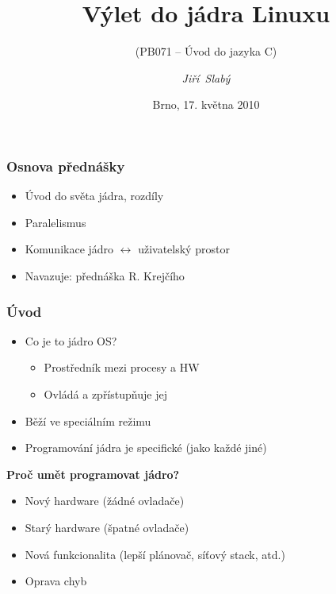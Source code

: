 \documentclass[xcolor=dvipsnames]{beamer}
\title[Linux Kernel] %
{Výlet do jádra Linuxu}
\subtitle{(PB071 -- Úvod do jazyka C)}
\author[J. Slabý]{\emph{Jiří~Slabý}}
\institute[FI] %
{Fakulta Informatiky, Masarykova Univerzita}
\date[17. 5. 2010, Brno]{Brno, 17. května 2010}
\newcommand{\heading}[1]{\textbf{\textcolor{BurntOrange}{#1}}}
\begin{document}
\begin{frame}
  \titlepage
\end{frame}


\begin{frame}
  \frametitle{Osnova přednášky}
  \begin{itemize}
  \item Úvod do světa jádra, rozdíly
  \item Paralelismus
  \item Komunikace jádro $\leftrightarrow$ uživatelský prostor
  \item Navazuje: přednáška R. Krejčího
  \end{itemize}
\end{frame}

\begin{frame}
  \frametitle{Úvod}
  \begin{itemize}
  \item Co je to jádro OS?
  \begin{itemize}
  \item Prostředník mezi procesy a HW
  \item Ovládá a zpřístupňuje jej
  \end{itemize}
  \item Běží ve speciálním režimu
  \item Programování jádra je specifické (jako každé jiné)
  \end{itemize}

  \pause
  \medskip

  \heading{Proč umět programovat jádro?}
  \begin{itemize}
  \item Nový hardware (žádné ovladače)
  \item Starý hardware (špatné ovladače)
  \item Nová funkcionalita (lepší plánovač, síťový stack, atd.)
  \item Oprava chyb
  \end{itemize}

\end{frame}
\end{document}

